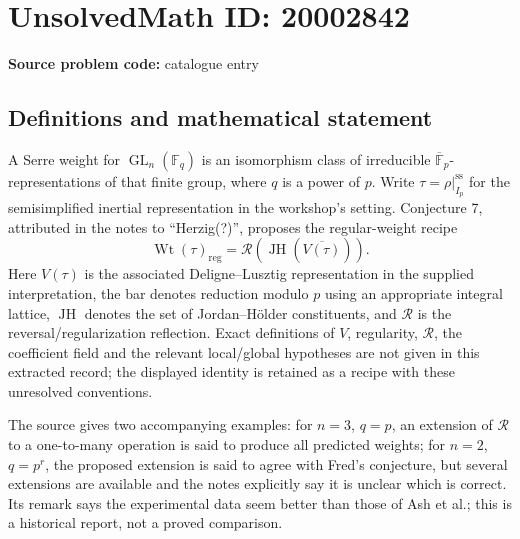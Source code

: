 \documentclass[11pt]{article}
\newcommand{\F}{\mathbb{F}}
\begin{document}
\section*{UnsolvedMath ID: 20002842}
\textbf{Source problem code:} catalogue entry
\subsection{Definitions and mathematical statement}
A Serre weight for $\operatorname{GL}_n(\F_q)$ is an isomorphism class of irreducible $\overline{\F}_p$-representations of that finite group, where $q$ is a power of $p$. Write $\tau=\rho|_{I_p}^{\mathrm{ss}}$ for the semisimplified inertial representation in the workshop's setting. Conjecture 7, attributed in the notes to ``Herzig(?)'', proposes the regular-weight recipe
\[
\operatorname{Wt}(\tau)_{\mathrm{reg}}
=\mathcal R\left(\operatorname{JH}\left(\overline{V(\tau)}\right)\right).
\]
Here $V(\tau)$ is the associated Deligne--Lusztig representation in the supplied interpretation, the bar denotes reduction modulo $p$ using an appropriate integral lattice, $\operatorname{JH}$ denotes the set of Jordan--H\"older constituents, and $\mathcal R$ is the reversal/regularization reflection. Exact definitions of $V$, regularity, $\mathcal R$, the coefficient field and the relevant local/global hypotheses are not given in this extracted record; the displayed identity is retained as a recipe with these unresolved conventions.

The source gives two accompanying examples: for $n=3$, $q=p$, an extension of $\mathcal R$ to a one-to-many operation is said to produce all predicted weights; for $n=2$, $q=p^r$, the proposed extension is said to agree with Fred's conjecture, but several extensions are available and the notes explicitly say it is unclear which is correct. Its remark says the experimental data seem better than those of Ash et al.; this is a historical report, not a proved comparison.
\end{document}
